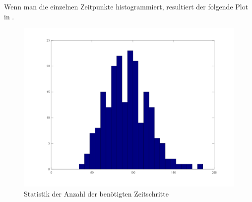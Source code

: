 Wenn man die einzelnen Zeitpunkte histogrammiert, resultiert der folgende Plot
in .
\begin{figure}[htb]
  \centering
    \includegraphics[width=1\columnwidth,keepaspectratio]{../figure_std}
    \caption{Statistik der Anzahl der benötigten Zeitschritte}
  \label{fig:hist_zeitschritte}
\end{figure}


